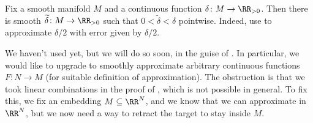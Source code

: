 \documentclass[../notes.tex]{subfiles}
\begin{document}
\begin{example}
	Fix a smooth manifold $M$ and a continuous function $\delta\colon M\to\RR_{>0}$. Then there is smooth $\widetilde\delta\colon M\to\RR_{>0}$ such that $0<\widetilde\delta<\delta$ pointwise. Indeed, use  to approximate $\delta/2$ with error given by $\delta/2$.
\end{example}
We haven't used  yet, but we will do so soon, in the guise of . In particular, we would like to upgrade  to smoothly approximate arbitrary continuous functions $F\colon N\to M$ (for suitable definition of approximation). The obstruction is that we took linear combinations in the proof of , which is not possible in general. To fix this, we fix an embedding $M\subseteq\RR^N$, and we know that we can approximate in $\RR^N$, but we now need a way to retract the target to stay inside $M$.
\end{document}
